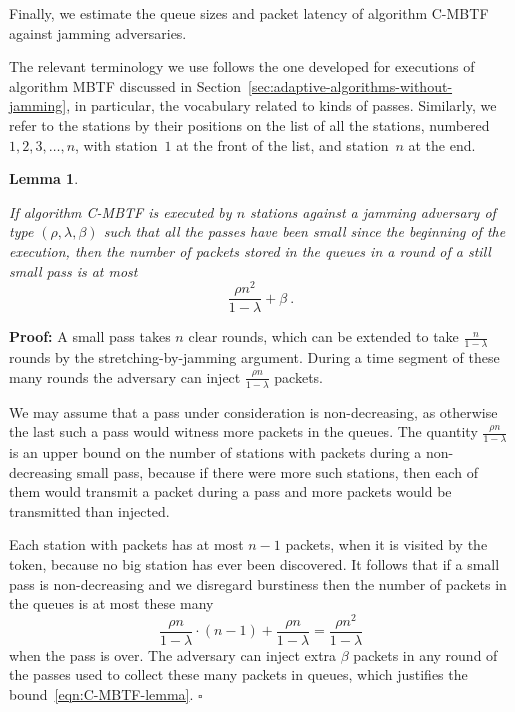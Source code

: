 \documentclass[11pt]{article}
\newcommand{\qed}{\hfill $\square$}
\newtheorem{lemma}{Lemma}
\newenvironment{proof}{\noindent\textbf{Proof: }}{\qed \smallbreak}
\begin{document}
Finally, we estimate the queue sizes and packet latency of algorithm \textsc{C-MBTF} against jamming adversaries.

The relevant terminology we use follows the one developed for executions of algorithm \textsc{MBTF} discussed in Section~\ref{sec:adaptive-algorithms-without-jamming}, in particular, the vocabulary related to kinds of passes.
Similarly, we refer to the stations by their positions on the list of all the stations, numbered $1,2,3,\ldots, n$, with station~$1$ at the front of the list, and station~$n$ at the end.



\begin{lemma}
\label{lem:queues-MBTF-small-jamming}

If algorithm  \textsc{C-MBTF} is executed by $n$ stations against a jamming adversary of type $(\rho,\lambda,\beta)$ such that all the passes have been small since the beginning of the execution,  then the number of packets stored in the queues in a round of a still small pass is at most 
\begin{equation}
\label{eqn:C-MBTF-lemma}
\frac{\rho  n^2}{1-\lambda} + \beta
\ .
\end{equation} 
\end{lemma}

\begin{proof}
A small pass takes $n$ clear rounds, which can be extended to take $\frac{n}{1-\lambda}$ rounds by the stretching-by-jamming argument.
During a time segment of these many rounds the adversary can inject $\frac{\rho n}{1-\lambda}$ packets.

We may assume that a pass under consideration is non-decreasing, as otherwise the last such a pass would witness more packets in the queues.
The quantity $\frac{\rho n}{1-\lambda}$ is an upper bound on the number of stations with packets during a non-decreasing small pass, because if there were more such stations, then each of them would transmit a packet during a pass and more packets would be transmitted than injected.

Each station with packets has at most $n-1$ packets, when it is visited by the token, because no big station has ever been discovered.
It follows that if a small pass is non-decreasing and we disregard burstiness then the number of packets in the queues is at most these many
\[
 \frac{\rho n}{1-\lambda}\cdot(n-1) +  \frac{\rho n}{1-\lambda}
 =
 \frac{\rho  n^2}{1-\lambda} 
\]
when the pass is over.
The adversary can inject extra $\beta$ packets in any round of the passes used to collect these many packets in queues, which justifies the bound~\eqref{eqn:C-MBTF-lemma}.
\end{proof}
\end{document}
